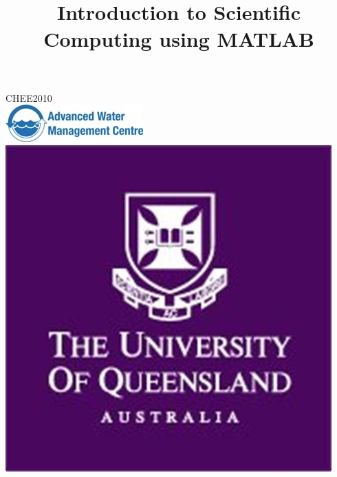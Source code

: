 \documentclass[12pt]{article}
\title{Introduction to Scientific Computing using MATLAB}
\begin{document}
\begin{titlepage}

\newcommand{\HRule}{\rule{\linewidth}{0.5mm}} %

\center %
 

\textsc{\LARGE CHEE2010}\\[1.5cm] %
\includegraphics[scale=1.2]{awmc.jpg}\\[1cm] %
\includegraphics[scale=0.3]{uq.jpg}\\[1cm]
\textsc{\Large }\\[0.5cm] %



\end{titlepage}
\end{document}
